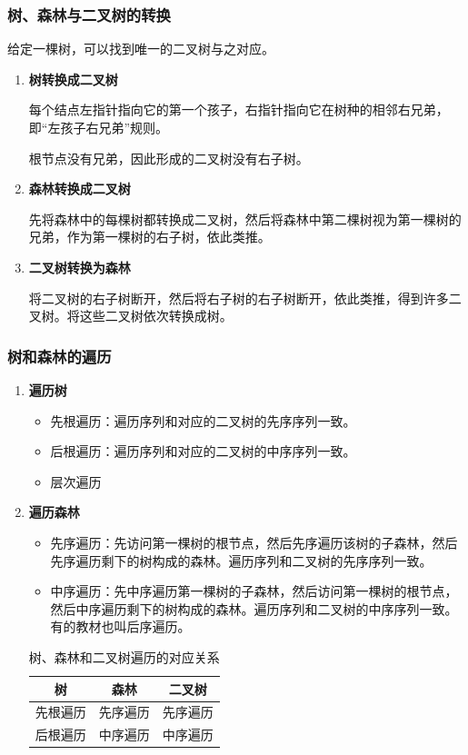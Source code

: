 \documentclass[12pt, a4paper, oneside]{ctexart}
\begin{document}
\subsubsection{树、森林与二叉树的转换}

给定一棵树，可以找到唯一的二叉树与之对应。
\begin{enumerate}
  \item {\bf 树转换成二叉树}
  
  每个结点左指针指向它的第一个孩子，右指针指向它在树种的相邻右兄弟，即“左孩子右兄弟”规则。

  根节点没有兄弟，因此形成的二叉树没有右子树。

  \item {\bf 森林转换成二叉树}
  
  先将森林中的每棵树都转换成二叉树，然后将森林中第二棵树视为第一棵树的兄弟，作为第一棵树的右子树，依此类推。

  \item {\bf 二叉树转换为森林}
  
  将二叉树的右子树断开，然后将右子树的右子树断开，依此类推，得到许多二叉树。将这些二叉树依次转换成树。
\end{enumerate}

\subsubsection{树和森林的遍历}

\begin{enumerate}
  \item {\bf 遍历树}
  
  \begin{itemize}
    \item 先根遍历：遍历序列和对应的二叉树的先序序列一致。
    \item 后根遍历：遍历序列和对应的二叉树的中序序列一致。
    \item 层次遍历
  \end{itemize}

  \item {\bf 遍历森林}
  
  \begin{itemize}
    \item 先序遍历：先访问第一棵树的根节点，然后先序遍历该树的子森林，然后先序遍历剩下的树构成的森林。遍历序列和二叉树的先序序列一致。
    \item 中序遍历：先中序遍历第一棵树的子森林，然后访问第一棵树的根节点，然后中序遍历剩下的树构成的森林。遍历序列和二叉树的中序序列一致。有的教材也叫后序遍历。
  \end{itemize}

  \begin{table}
    \centering
    \caption{树、森林和二叉树遍历的对应关系}
    \begin{tabular}{c|c|c}
      \hline
      \textbf{树} & \textbf{森林} & \textbf{二叉树} \\ \hline
      先根遍历 & 先序遍历 & 先序遍历 \\ \hline
      后根遍历 & 中序遍历 & 中序遍历 \\
      \hline
    \end{tabular}
  \end{table}
\end{enumerate}
\end{document}
